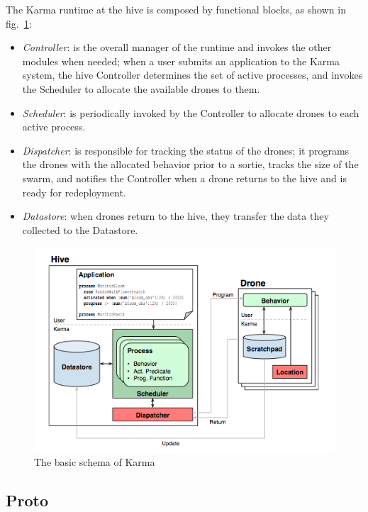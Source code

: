 The Karma\cite{karma} runtime at the hive is composed by functional blocks, as shown in fig.~\ref{fig:karma}:

\begin{itemize}
\itemsep2pt
\item{
\textit{Controller}: is the overall manager of the runtime and invokes the other modules when needed; when a user submits an application to the Karma system, the hive Controller determines the set of active processes, and invokes the Scheduler to allocate the available drones to them.
}
\item{
\textit{Scheduler}: is periodically invoked by the Controller to allocate drones to each active process.
}
\item{
\textit{Dispatcher}:  is responsible for tracking the status of the drones; it programs the drones with the allocated behavior prior to a sortie, tracks the size of the swarm, and notifies the Controller when a drone returns to the hive and is ready for redeployment.
}
\item{
\textit{Datastore}: when drones return to the hive, they transfer the data they collected to the Datastore.
}
\end{itemize}


\begin{figure}[htbp]
  \centering
  \includegraphics[width=\linewidth]{pictures/Karma.png}
  \caption{The basic schema of Karma}
  \label{fig:karma}
\end{figure}

\newpage

\subsection{Proto}\label{proto}

